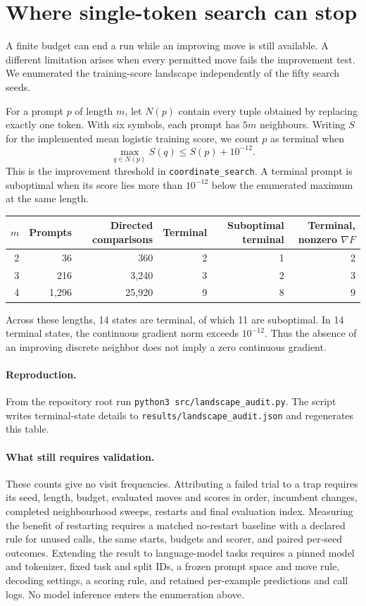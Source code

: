 \section{Where single-token search can stop}
\label{sec:coordinate-stopping}
A finite budget can end a run while an improving move is still available.
A different limitation arises when every permitted move fails the improvement
test. We enumerated the training-score landscape independently of the fifty search seeds.

For a prompt $p$ of length $m$, let $N(p)$ contain every tuple obtained by
replacing exactly one token. With six symbols, each prompt has $5m$ neighbours.
Writing $S$ for the implemented mean logistic training score, we count $p$
as terminal when
\[
  \max_{q\in N(p)} S(q) \leq S(p)+10^{-12}.
\]
This is the improvement threshold in \texttt{coordinate\_search}. A terminal
prompt is suboptimal when its score lies more than $10^{-12}$ below the
enumerated maximum at the same length.

\begin{center}
\begin{tabular}{rrrrrr}
\toprule
$m$ & Prompts & Directed comparisons & Terminal & Suboptimal terminal & Terminal, nonzero $\nabla F$ \\
\midrule
2 & 36 & 360 & 2 & 1 & 2 \\
3 & 216 & 3,240 & 3 & 2 & 3 \\
4 & 1,296 & 25,920 & 9 & 8 & 9 \\
\bottomrule
\end{tabular}
\end{center}

Across these lengths, 14 states are terminal, of which 11 are suboptimal. In 14 terminal states, the continuous gradient norm exceeds $10^{-12}$. Thus the absence of an improving discrete neighbor does not imply a zero continuous gradient.

\paragraph{Reproduction.}
From the repository root run \texttt{python3 src/landscape\_audit.py}.
The script writes terminal-state details to
\texttt{results/landscape\_audit.json} and regenerates this table.

\paragraph{What still requires validation.}
These counts give no visit frequencies. Attributing a failed trial to a trap
requires its seed, length, budget, evaluated moves and scores in order,
incumbent changes, completed neighbourhood sweeps, restarts and final
evaluation index. Measuring the benefit of restarting requires a matched
no-restart baseline with a declared rule for unused calls, the same starts,
budgets and scorer, and paired per-seed outcomes. Extending the result to
language-model tasks requires a pinned model and tokenizer, fixed task and
split IDs, a frozen prompt space and move rule, decoding settings, a scoring
rule, and retained per-example predictions and call logs. No model inference
enters the enumeration above.
